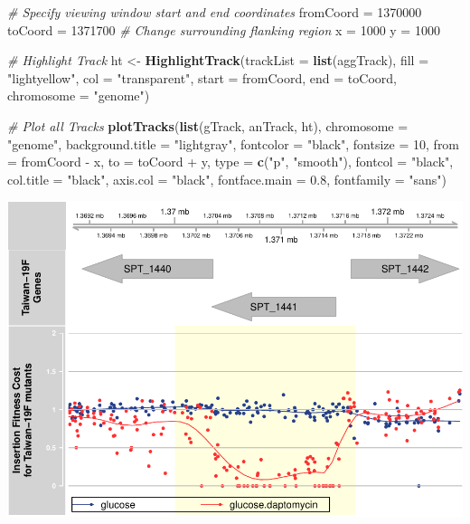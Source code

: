 \documentclass[11pt,]{article}
\newenvironment{Shaded}{\begin{snugshade}}{\end{snugshade}}
\newcommand{\KeywordTok}[1]{\textcolor[rgb]{0.13,0.29,0.53}{\textbf{{#1}}}}
\newcommand{\DataTypeTok}[1]{\textcolor[rgb]{0.13,0.29,0.53}{{#1}}}
\newcommand{\DecValTok}[1]{\textcolor[rgb]{0.00,0.00,0.81}{{#1}}}
\newcommand{\FloatTok}[1]{\textcolor[rgb]{0.00,0.00,0.81}{{#1}}}
\newcommand{\StringTok}[1]{\textcolor[rgb]{0.31,0.60,0.02}{{#1}}}
\newcommand{\CommentTok}[1]{\textcolor[rgb]{0.56,0.35,0.01}{\textit{{#1}}}}
\newcommand{\NormalTok}[1]{{#1}}
\begin{document}
\begin{Shaded}
\begin{Highlighting}[]
\CommentTok{# Specify viewing window start and end coordinates}
\NormalTok{fromCoord =}\StringTok{ }\DecValTok{1370000}
\NormalTok{toCoord =}\StringTok{ }\DecValTok{1371700}
\CommentTok{# Change surrounding flanking region}
\NormalTok{x =}\StringTok{ }\DecValTok{1000}
\NormalTok{y =}\StringTok{ }\DecValTok{1000}

\CommentTok{# Highlight Track}
\NormalTok{ht <-}\StringTok{ }\KeywordTok{HighlightTrack}\NormalTok{(}\DataTypeTok{trackList =} \KeywordTok{list}\NormalTok{(aggTrack), }\DataTypeTok{fill =} \StringTok{"lightyellow"}\NormalTok{, }
    \DataTypeTok{col =} \StringTok{"transparent"}\NormalTok{, }\DataTypeTok{start =} \NormalTok{fromCoord, }\DataTypeTok{end =} \NormalTok{toCoord, }
    \DataTypeTok{chromosome =} \StringTok{"genome"}\NormalTok{)}

\CommentTok{# Plot all Tracks}
\KeywordTok{plotTracks}\NormalTok{(}\KeywordTok{list}\NormalTok{(gTrack, anTrack, ht), }\DataTypeTok{chromosome =} \StringTok{"genome"}\NormalTok{, }
    \DataTypeTok{background.title =} \StringTok{"lightgray"}\NormalTok{, }\DataTypeTok{fontcolor =} \StringTok{"black"}\NormalTok{, }
    \DataTypeTok{fontsize =} \DecValTok{10}\NormalTok{, }\DataTypeTok{from =} \NormalTok{fromCoord -}\StringTok{ }\NormalTok{x, }\DataTypeTok{to =} \NormalTok{toCoord +}\StringTok{ }
\StringTok{        }\NormalTok{y, }\DataTypeTok{type =} \KeywordTok{c}\NormalTok{(}\StringTok{"p"}\NormalTok{, }\StringTok{"smooth"}\NormalTok{), }\DataTypeTok{fontcol =} \StringTok{"black"}\NormalTok{, }
    \DataTypeTok{col.title =} \StringTok{"black"}\NormalTok{, }\DataTypeTok{axis.col =} \StringTok{"black"}\NormalTok{, }\DataTypeTok{fontface.main =} \FloatTok{0.8}\NormalTok{, }
    \DataTypeTok{fontfamily =} \StringTok{"sans"}\NormalTok{)}
\end{Highlighting}
\end{Shaded}

\includegraphics{magentaManual_files/figure-latex/unnamed-chunk-8-1.pdf}
\end{document}

